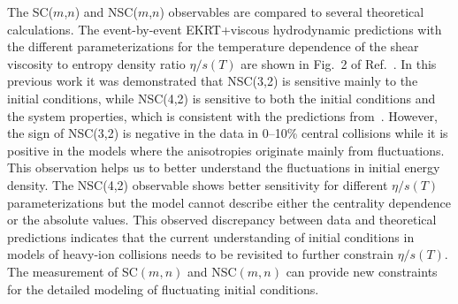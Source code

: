 The SC($m$,$n$) and NSC($m$,$n$) observables are compared to several theoretical calculations. The event-by-event EKRT+viscous hydrodynamic predictions with the different parameterizations for the temperature dependence of the shear viscosity to entropy density ratio $\eta/s(T)$ are shown in Fig.~2 of Ref.~\cite{ALICE:2016kpq}. 
In this previous work it was demonstrated that NSC(3,2) is sensitive mainly to the initial conditions, while NSC(4,2) is sensitive to both the initial conditions and the system properties, which is consistent with the predictions from~\cite{Niemi:2012aj}.
However, the sign of NSC(3,2) is negative in the data in 0--10\% central collisions while it is positive in the models where the anisotropies originate mainly from fluctuations.
This observation helps us to better understand the fluctuations in initial energy density.
The NSC(4,2) observable shows better sensitivity for different $\eta/s(T)$ parameterizations but the model cannot describe either the centrality dependence or the absolute values. This observed discrepancy between data and theoretical predictions indicates that the current understanding of initial conditions in models of heavy-ion collisions needs to be revisited to further constrain $\eta/s(T)$.
The measurement of SC$(m,n)$ and NSC$(m,n)$ can provide new constraints for the detailed modeling of fluctuating initial conditions.

